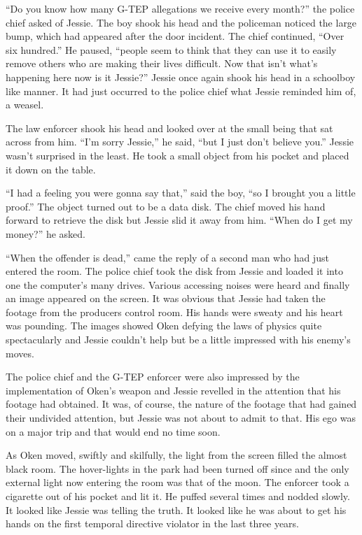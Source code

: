 ``Do you know how many G-TEP allegations we receive every month?'' the police chief asked of Jessie.  The boy shook his head and the policeman noticed the large bump, which had appeared after the door incident.  The chief continued, ``Over six hundred.''  He paused, ``people seem to think that they can use it to easily remove others who are making their lives difficult.  Now that isn't what's happening here now is it Jessie?''  Jessie once again shook his head in a schoolboy like manner.  It had just occurred to the police chief what Jessie reminded him of, a weasel.  

The law enforcer shook his head and looked over at the small being that sat across from him.  ``I'm sorry Jessie,'' he said, ``but I just don't believe you.''  Jessie wasn't surprised in the least.  He took a small object from his pocket and placed it down on the table.

``I had a feeling you were gonna say that,'' said the boy, ``so I brought you a little proof.''  The object turned out to be a data disk.  The chief moved his hand forward to retrieve the disk but Jessie slid it away from him.  ``When do I get my money?'' he asked.

``When the offender is dead,'' came the reply of a second man who had just entered the room.  The police chief took the disk from Jessie and loaded it into one the computer's many drives.  Various accessing noises were heard and finally an image appeared on the screen.  It was obvious that Jessie had taken the footage from the producers control room.  His hands were sweaty and his heart was pounding.  The images showed Oken defying the laws of physics quite spectacularly and Jessie couldn't help but be a little impressed with his enemy's moves.

The police chief and the G-TEP enforcer were also impressed by the implementation of Oken's weapon and Jessie revelled in the attention that his footage had obtained.  It was, of course, the nature of the footage that had gained their undivided attention, but Jessie was not about to admit to that.  His ego was on a major trip and that would end no time soon.

As Oken moved, swiftly and skilfully, the light from the screen filled the almost black room.  The hover-lights in the park had been turned off since and the only external light now entering the room was that of the moon.  The enforcer took a cigarette out of his pocket and lit it.  He puffed several times and nodded slowly.  It looked like Jessie was telling the truth.  It looked like he was about to get his hands on the first temporal directive violator in the last three years.

